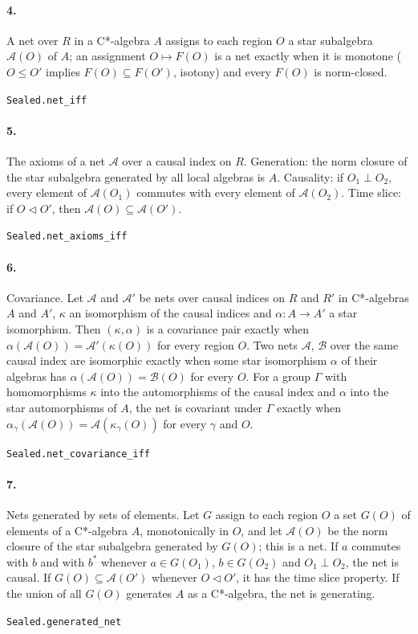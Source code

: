 \documentclass[11pt]{article}
\begin{document}
\paragraph{4.} A net over $R$ in a C*-algebra $A$ assigns to each region $O$ a star subalgebra $\mathcal A(O)$ of $A$; an assignment $O \mapsto F(O)$ is a net exactly when it is monotone ($O \le O'$ implies $F(O) \subseteq F(O')$, isotony) and every $F(O)$ is norm-closed.\par{\footnotesize\texttt{Sealed.net\_iff}}

\paragraph{5.} The axioms of a net $\mathcal A$ over a causal index on $R$. Generation: the norm closure of the star subalgebra generated by all local algebras is $A$. Causality: if $O_1 \perp O_2$, every element of $\mathcal A(O_1)$ commutes with every element of $\mathcal A(O_2)$. Time slice: if $O \triangleleft O'$, then $\mathcal A(O) \subseteq \mathcal A(O')$.\par{\footnotesize\texttt{Sealed.net\_axioms\_iff}}

\paragraph{6.} Covariance. Let $\mathcal A$ and $\mathcal A'$ be nets over causal indices on $R$ and $R'$ in C*-algebras $A$ and $A'$, $\kappa$ an isomorphism of the causal indices and $\alpha : A \to A'$ a star isomorphism. Then $(\kappa, \alpha)$ is a covariance pair exactly when $\alpha(\mathcal A(O)) = \mathcal A'(\kappa(O))$ for every region $O$. Two nets $\mathcal A$, $\mathcal B$ over the same causal index are isomorphic exactly when some star isomorphism $\alpha$ of their algebras has $\alpha(\mathcal A(O)) = \mathcal B(O)$ for every $O$. For a group $\Gamma$ with homomorphisms $\kappa$ into the automorphisms of the causal index and $\alpha$ into the star automorphisms of $A$, the net is covariant under $\Gamma$ exactly when $\alpha_\gamma(\mathcal A(O)) = \mathcal A(\kappa_\gamma(O))$ for every $\gamma$ and $O$.\par{\footnotesize\texttt{Sealed.net\_covariance\_iff}}

\paragraph{7.} Nets generated by sets of elements. Let $G$ assign to each region $O$ a set $G(O)$ of elements of a C*-algebra $A$, monotonically in $O$, and let $\mathcal A(O)$ be the norm closure of the star subalgebra generated by $G(O)$; this is a net. If $a$ commutes with $b$ and with $b^*$ whenever $a \in G(O_1)$, $b \in G(O_2)$ and $O_1 \perp O_2$, the net is causal. If $G(O) \subseteq \mathcal A(O')$ whenever $O \triangleleft O'$, it has the time slice property. If the union of all $G(O)$ generates $A$ as a C*-algebra, the net is generating.\par{\footnotesize\texttt{Sealed.generated\_net}}
\end{document}
